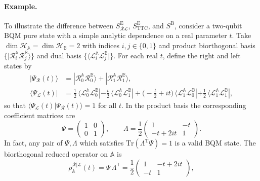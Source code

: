 \documentclass[11pt,a4paper]{article}
\newcommand{\Tr}{\text{Tr}}
\begin{document}
\paragraph{Example.}
To illustrate the difference between $S^\mathrm{E}_{\mathcal{RL}}$, $S^\mathrm{E}_{\mathrm{TTC}}$, and $S^{\mathrm B}$, consider a two-qubit BQM pure state with a simple analytic dependence on a real parameter $t$. Take $\dim\mathcal H_\mathbb{A} = \dim\mathcal H_\mathbb{B} = 2$ with indices $i,j\in\{0,1\}$ and product biorthogonal basis
$\{|\mathcal{R}^\mathbb{A}_i \mathcal{R}^\mathbb{B}_j\rangle\}$ and dual basis $\{\langle \mathcal{L}^\mathbb{A}_i \mathcal{L}^\mathbb{B}_j|\}$. For each real $t$, define the right and left states by
\begin{equation}
\begin{aligned}
|\Psi_{\mathcal R}(t)\rangle
&= |\mathcal{R}^\mathbb{A}_0 \mathcal{R}^\mathbb{B}_0\rangle
 + |\mathcal{R}^\mathbb{A}_1 \mathcal{R}^\mathbb{B}_1\rangle, \\
\langle\Psi_{\mathcal L}(t)|
&= \tfrac{1}{2}\,\langle \mathcal{L}^\mathbb{A}_0 \mathcal{L}^\mathbb{B}_0|
 - \tfrac{t}{2}\,\langle \mathcal{L}^\mathbb{A}_0 \mathcal{L}^\mathbb{B}_1|
 + \bigl(-\tfrac{t}{2} + i t\bigr)\,\langle \mathcal{L}^\mathbb{A}_1 \mathcal{L}^\mathbb{B}_0|
 + \tfrac{1}{2}\,\langle \mathcal{L}^\mathbb{A}_1 \mathcal{L}^\mathbb{B}_1|,
\end{aligned}
\end{equation}
so that $\langle\Psi_{\mathcal L}(t)|\Psi_{\mathcal R}(t)\rangle=1$ for all $t$.
In the product basis the corresponding coefficient matrices are
\begin{equation}
\Psi =
\begin{pmatrix}
1 & 0\\
0 & 1
\end{pmatrix},
\qquad
\Lambda = \frac{1}{2}
\begin{pmatrix}
1 & -t\\[2pt]
-t + 2i t & 1
\end{pmatrix}.
\end{equation}
In fact, any pair of $\Psi,\Lambda$ which satisfies $\Tr(\Lambda^\mathrm T\Psi)=1$ is a valid BQM state. The biorthogonal reduced operator on $\mathbb A$ is
\begin{equation}
\rho_\mathbb{A}^{\mathcal{R|L}}(t)
= \Psi\,\Lambda^{\mathsf T}
=\frac{1}{2}
\begin{pmatrix}
1 & -t + 2i t\\[2pt]
-t & 1
\end{pmatrix},
\end{equation}
\end{document}
